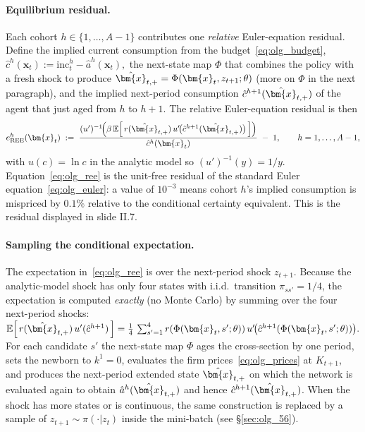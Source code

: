 \documentclass[11pt,a4paper]{report}
\newcommand{\x}{\bm{x}}
\newcommand{\E}[1]{\mathbb{E}\!\left[#1\right]}
\begin{document}
\paragraph{Equilibrium residual.}
Each cohort $h\in\{1,\ldots,A-1\}$ contributes one \emph{relative} Euler-equation residual.  Define the implied current consumption from the budget~\eqref{eq:olg_budget},
\(
\hat c^h(\x_t) := \mathrm{inc}_t^h - \hat a^h(\x_t),
\)
the next-state map $\Phi$ that combines the policy with a fresh shock to produce $\hat\x_{t,+}=\Phi(\x_t,z_{t+1};\theta)$ (more on $\Phi$ in the next paragraph), and the implied next-period consumption $\hat c^{h+1}(\hat\x_{t,+})$ of the agent that just aged from $h$ to $h+1$.  The relative Euler-equation residual is then
\begin{equation}
e_{\mathrm{REE}}^h(\x_t)
\;:=\;
\frac{(u')^{-1}\!\Bigl(\beta\,\E{\,r(\hat\x_{t,+})\,u'\!\bigl(\hat c^{h+1}(\hat\x_{t,+})\bigr)\,}\Bigr)}{\hat c^h(\x_t)} \;-\; 1,
\qquad h=1,\ldots,A-1,
\label{eq:olg_ree}
\end{equation}
with $u(c)=\ln c$ in the analytic model so $(u')^{-1}(y) = 1/y$.  Equation~\eqref{eq:olg_ree} is the unit-free residual of the standard Euler equation~\eqref{eq:olg_euler}: a value of $10^{-3}$ means cohort $h$'s implied consumption is mispriced by $0.1\%$ relative to the conditional certainty equivalent.  This is the residual displayed in slide II.7.

\paragraph{Sampling the conditional expectation.}
The expectation in~\eqref{eq:olg_ree} is over the next-period shock $z_{t+1}$.  Because the analytic-model shock has only four states with i.i.d.\ transition $\pi_{ss'} = 1/4$, the expectation is computed \emph{exactly} (no Monte Carlo) by summing over the four next-period shocks:
\(
\E{\,r(\hat\x_{t,+})\,u'(\hat c^{h+1})\,} = \tfrac14\,\sum_{s'=1}^{4} r(\Phi(\x_t,s';\theta))\,u'\!\bigl(\hat c^{h+1}(\Phi(\x_t,s';\theta))\bigr).
\)
For each candidate $s'$ the next-state map $\Phi$ ages the cross-section by one period, sets the newborn to $k^1=0$, evaluates the firm prices~\eqref{eq:olg_prices} at $K_{t+1}$, and produces the next-period extended state $\hat\x_{t,+}$ on which the network is evaluated again to obtain $\hat a^h(\hat\x_{t,+})$ and hence $\hat c^{h+1}(\hat\x_{t,+})$.  When the shock has more states or is continuous, the same construction is replaced by a sample of $z_{t+1}\sim\pi(\cdot|z_t)$ inside the mini-batch (see \S\ref{sec:olg_56}).
\end{document}
